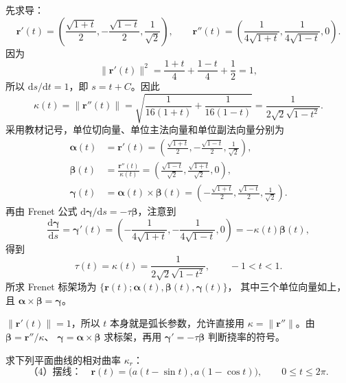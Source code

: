 \begin{solution}
先求导：
\[
\bm r'(t)=\left(\frac{\sqrt{1+t}}2,-\frac{\sqrt{1-t}}2,\frac1{\sqrt2}\right),
\qquad
\bm r''(t)=\left(\frac1{4\sqrt{1+t}},\frac1{4\sqrt{1-t}},0\right).
\]
因为
\[
\lVert\bm r'(t)\rVert^2=\frac{1+t}4+\frac{1-t}4+\frac12=1,
\]
所以 $\mathrm ds/\mathrm dt=1$，即 $s=t+C$。因此
\[
\kappa(t)=\lVert\bm r''(t)\rVert
=\sqrt{\frac1{16(1+t)}+\frac1{16(1-t)}}
=\boxed{\frac1{2\sqrt2\sqrt{1-t^2}}}.
\]
采用教材记号，单位切向量、单位主法向量和单位副法向量分别为
\begin{align*}
\bm\alpha(t)&=\bm r'(t)
=\left(\frac{\sqrt{1+t}}2,-\frac{\sqrt{1-t}}2,\frac1{\sqrt2}\right),\\[3pt]
\bm\beta(t)&=\frac{\bm r''(t)}{\kappa(t)}
=\left(\frac{\sqrt{1-t}}{\sqrt2},\frac{\sqrt{1+t}}{\sqrt2},0\right),\\[3pt]
\bm\gamma(t)&=\bm\alpha(t)\times\bm\beta(t)
=\left(-\frac{\sqrt{1+t}}2,\frac{\sqrt{1-t}}2,\frac1{\sqrt2}\right).
\end{align*}
再由 Frenet 公式 $\mathrm d\bm\gamma/\mathrm ds=-\tau\bm\beta$，注意到
\[
\frac{\mathrm d\bm\gamma}{\mathrm ds}
=\bm\gamma'(t)
=\left(-\frac1{4\sqrt{1+t}},-\frac1{4\sqrt{1-t}},0\right)
=-\kappa(t)\bm\beta(t),
\]
得到
\[
\boxed{\tau(t)=\kappa(t)=\frac1{2\sqrt2\sqrt{1-t^2}}},\qquad -1<t<1.
\]
所求 Frenet 标架场为 $\boxed{\{\bm r(t);\bm\alpha(t),\bm\beta(t),\bm\gamma(t)\}}$，
其中三个单位向量如上，且 $\bm\alpha\times\bm\beta=\bm\gamma$。
\end{solution}

\begin{dxtips}\label{hw:curves:tip4}
$\lVert\bm r'(t)\rVert=1$，所以 $t$ 本身就是弧长参数，允许直接用
$\kappa=\lVert\bm r''\rVert$。由 $\bm\beta=\bm r''/\kappa$、
$\bm\gamma=\bm\alpha\times\bm\beta$ 求标架，再用
$\bm\gamma'=-\tau\bm\beta$ 判断挠率的符号。
\end{dxtips}

\clearpage
\begin{homework}[教材第71页，习题2.8，第1题（4）]
\par\smallskip
求下列平面曲线的相对曲率 $\kappa_r$：
\[
\text{（4）摆线：}\quad
\bm r(t)=\bigl(a(t-\sin t),a(1-\cos t)\bigr),\qquad 0\le t\le2\pi.
\]
\end{homework}

